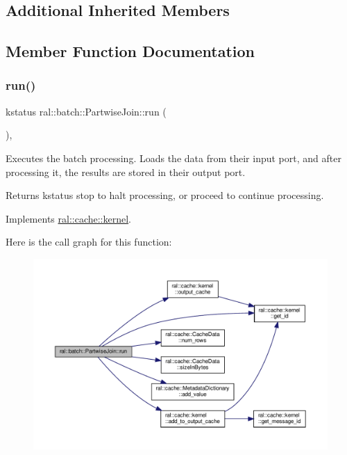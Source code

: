 \subsection*{Additional Inherited Members}


\subsection{Member Function Documentation}
\mbox{\label{classral_1_1batch_1_1PartwiseJoin_a280aee308eff9e14f239cdce229c4035}} 
\subsubsection{\texorpdfstring{run()}{run()}}
{\footnotesize\ttfamily kstatus ral\+::batch\+::\+Partwise\+Join\+::run (\begin{DoxyParamCaption}{ }\end{DoxyParamCaption})\hspace{0.3cm}{\ttfamily [override]}, {\ttfamily [virtual]}}



Executes the batch processing. Loads the data from their input port, and after processing it, the results are stored in their output port. 

\begin{DoxyReturn}{Returns}
kstatus \textquotesingle{}stop\textquotesingle{} to halt processing, or \textquotesingle{}proceed\textquotesingle{} to continue processing. 
\end{DoxyReturn}


Implements \hyperlink{classral_1_1cache_1_1kernel_a735b081cccae9574924e74ea6d293ef7}{ral\+::cache\+::kernel}.

Here is the call graph for this function\+:\nopagebreak
\begin{figure}[H]
\begin{center}
\leavevmode
\includegraphics[width=350pt]{classral_1_1batch_1_1PartwiseJoin_a280aee308eff9e14f239cdce229c4035_cgraph}
\end{center}
\end{figure}



